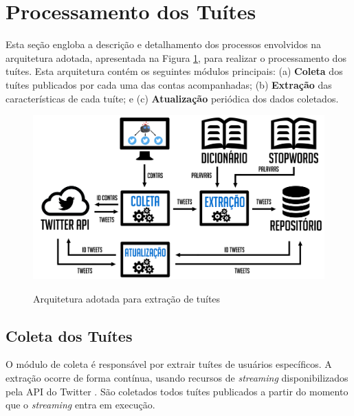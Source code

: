 \documentclass[oneside,openright,12pt]{ufsm_2015} %
\begin{document}

\section{Processamento dos Tuítes}
\label{sec:prop-processamento}

    \par Esta seção engloba a descrição e detalhamento dos processos envolvidos na arquitetura adotada, apresentada na Figura \ref{fig:arquitetura}, para realizar o processamento dos tuítes. Esta arquitetura contém os seguintes módulos principais: (a) \textbf{Coleta} dos tuítes publicados por cada uma das contas acompanhadas; (b) \textbf{Extração} das características de cada tuíte; e (c) \textbf{Atualização} periódica dos dados coletados.
    
    \begin{figure}[ht]
        \caption{Arquitetura adotada para extração de tuítes}
        \centering
        \includegraphics[width=1\textwidth]{figuras/arquitetura.png}
        \vspace{\baselineskip} %
        \label{fig:arquitetura}
    \end{figure}


\subsection{Coleta dos Tuítes}
\label{sec:prop-coleta}

    \par O módulo de coleta é responsável por extrair tuítes de usuários específicos. A extração ocorre de forma contínua, usando recursos de \textit{streaming} disponibilizados pela API do Twitter \cite{site:twitter-api}. São coletados todos tuítes publicados a partir do momento que o \textit{streaming} entra em execução.
    
\end{document}
